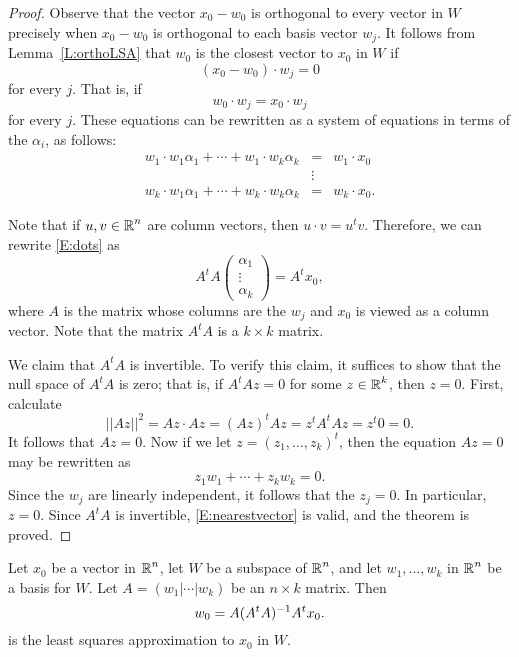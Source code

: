 \documentclass{ximera}
\begin{document}
\begin{proof} Observe that the vector $x_0-w_0$ is orthogonal to every vector in $W$
precisely when $x_0-w_0$ is orthogonal to each basis vector $w_j$.  It
follows from Lemma~\ref{L:orthoLSA} that $w_0$ is the closest vector to $x_0$
in $W$ if
\[
(x_0-w_0)\cdot w_j = 0
\]
for every $j$.  That is, if
\[
w_0\cdot w_j = x_0\cdot w_j
\]
for every $j$.  These equations can be rewritten as a system of equations in
terms of the $\alpha_i$, as follows:
\begin{equation}  \label{E:dots}
 \begin{array}{ccc}
w_1\cdot w_1\alpha_1 + \cdots + w_1\cdot w_k\alpha_k & = & w_1\cdot x_0\\
 & \vdots &  \\
w_k\cdot w_1\alpha_1 + \cdots + w_k\cdot w_k\alpha_k & = & w_k\cdot x_0.
\end{array}
\end{equation}

Note that if $u,v\in\mbox{$\mathbb{R}$}^n$ are column vectors, then $u\cdot v= u^tv$. Therefore,
we can rewrite \eqref{E:dots} as
\[
A^tA \left(\begin{array}{c} \alpha_1\\ \vdots \\ \alpha_k \end{array}\right) =
A^tx_0,
\]
where $A$ is the matrix whose columns are the $w_j$ and $x_0$ is viewed as a
column vector.  Note that the matrix $A^tA$ is a $k\times k$ matrix.

We claim that $A^tA$ is invertible.  To verify this claim, it suffices to
show that the null space
of $A^tA$ is zero; that is, if $A^tA z = 0$ for some
$z\in\mbox{$\mathbb{R}$}^k$, then $z=0$.  First, calculate
\[
||Az||^2 = Az\cdot Az = (Az)^tAz = z^tA^tAz= z^t0 = 0.
\]
It follows that $Az=0$.  Now if we let $z=(z_1,\ldots,z_k)^t$, then the
equation $Az=0$ may be rewritten as
\[
z_1w_1 + \cdots + z_kw_k = 0.
\]
Since the $w_j$ are linearly independent, it follows that the $z_j=0$.  In
particular, $z=0$.  Since $A^tA$ is invertible, \eqref{E:nearestvector} is
valid, and the theorem is proved. 
\end{proof}

\begin{corollary} \label{C:nearestvector}
Let $x_0$ be a vector in $\mbox{$\mathbb{R}$}^n$, let $W$ be a subspace of $\mbox{$\mathbb{R}$}^n$, and
let $w_1,\ldots,w_k$ in $\mbox{$\mathbb{R}$}^n$ be a basis for $W$.
Let $A = (w_1|\cdots| w_k)$ be an $n\times k$ matrix.  Then 
\begin{equation} \label{C:w_0_formula}
w_0 =  A(A^tA)^{-1} A^tx_0.
\end{equation}
 is the least squares approximation to $x_0$ in $W$.
\end{corollary}
\end{document}

